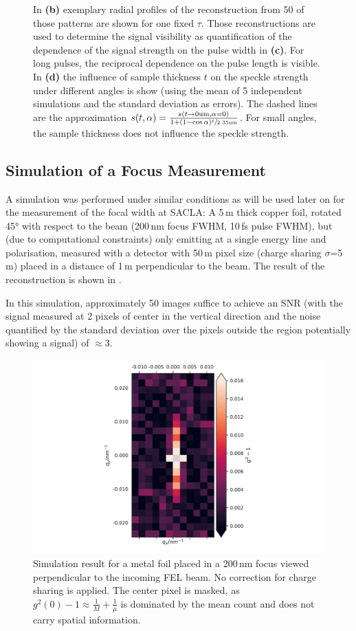 \begin{figure}
{	In \textbf{(b)} exemplary radial profiles of the reconstruction from 50 of those patterns are shown for one fixed $\tau$. Those reconstructions are used to determine the signal visibility as quantification of the  dependence of the signal strength on the pulse width in \textbf{(c)}. For long pulses, the reciprocal dependence on the pulse length is visible.
	In \textbf{(d)}  the influence of sample thickness $t$ on the speckle strength under different angles is show (using the mean of 5 independent simulations and the standard deviation as errors). The dashed lines are the approximation $s(t,\alpha)=\frac{s(t\rightarrow0\text{um}, \alpha= 0)}{1+\left(1-\cos{\alpha}\right)\sfrac{t}{2.35\text{um}}}$. For small angles, the sample thickness does not influence the speckle strength.}
\end{figure}

\subsection{Simulation of a Focus Measurement}
A simulation was performed under similar conditions as will be used later on for the measurement of the focal width at SACLA:  A 5\,\textmu m thick copper foil, rotated 45° with respect to the beam (200\,nm focus FWHM, 10\,fs pulse FWHM), but (due to computational constraints) only emitting at a single energy line and polarisation, measured with a detector with 50\,\textmu m pixel size (charge sharing $\sigma$=5\,\textmu m) placed in a distance of 1\,m perpendicular to the beam. The result of the reconstruction is shown in . 

In this simulation, approximately 50 images suffice to achieve an SNR (with the signal measured at 2 pixels of center in the vertical direction and the noise quantified by the standard deviation over the pixels outside the region potentially showing a signal) of $\approx$3.

\begin{figure}
	\centering
	\includegraphics[width=0.5\linewidth]{images/sim_foil5umCu_shared.pdf}
	\caption[Simulation of a metal foil with similar parameters as used in the experiment]{Simulation result for a metal foil placed in a 200\,nm focus viewed perpendicular to the incoming FEL beam. No correction for charge sharing is applied. The center pixel is masked, as $g^2(0)-1\approx 
		\frac{1}{M}+\frac{1}{\mu}$ is dominated by the mean count and does 
		not carry spatial information.}
	\label{fig:simfoil}
\end{figure}

